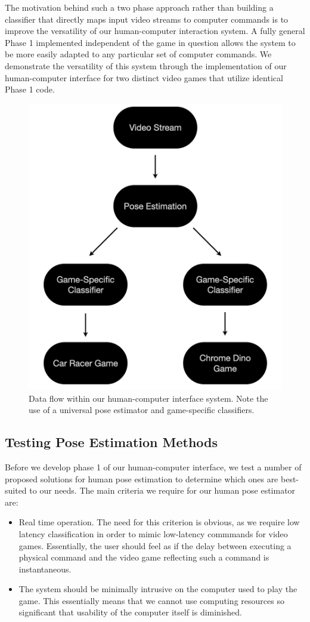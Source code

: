 \documentclass[10pt,twocolumn,letterpaper]{article}
\begin{document}
The motivation behind such a two phase approach rather than building a classifier that directly 
maps input video streams to computer commands is to improve the versatility of our human-computer 
interaction system. A fully general Phase 1 implemented independent of the game in question allows 
the system to be more easily adapted to any particular set of computer commands. We demonstrate the 
versatility of this system through the implementation of our human-computer interface for two 
distinct video games that utilize identical Phase 1 code.

\begin{figure}[h]
    \centering
    \includegraphics[width = .8\linewidth]{images/flow_chart.png}
    \caption{Data flow within our human-computer interface system. Note 
    the use of a universal pose estimator and game-specific classifiers.}
\end{figure}

\subsection{Testing Pose Estimation Methods}
Before we develop phase 1 of our human-computer interface, we test a number of proposed solutions 
for human pose estimation to determine which ones are best-suited to our needs. The main criteria 
we require for our human pose estimator are:

\begin{itemize}
    \item Real time operation. The need for this criterion is obvious, as we require low latency 
        classification in order to mimic low-latency commmands for video games. Essentially, the user 
        should feel as if the delay between executing a physical command and the video game reflecting 
        such a command is instantaneous.
    \item The system should be minimally intrusive on the computer used to play the game. This 
        essentially means that we cannot use computing resources so significant that usability of 
        the computer itself is diminished. 
\end{itemize}
\end{document}

